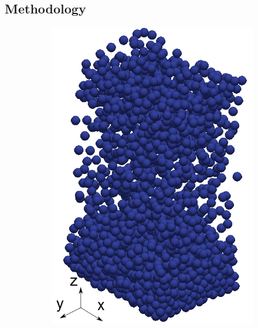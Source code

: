 \subsection{Methodology}
\label{method}
\begin{figure}[t]
	\centering
	\begin{subfigure}[b]{0.23\textwidth}
		\centering
		\includegraphics[width=\textwidth]{chapters/figures/fill01.png}
	\end{subfigure}
	\begin{subfigure}[b]{0.23\textwidth}
		\centering

\end{subfigure}
\end{figure}
